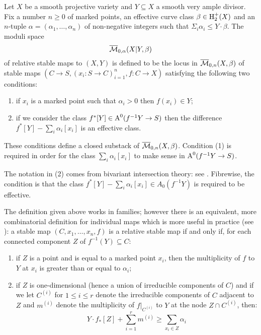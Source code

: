 \begin{definition} {\cite[Definition 1.1]{Ga}}  Let $X$ be a smooth projective variety and $Y \subseteq X$ a smooth very ample divisor. Fix a number $n \geq 0$ of marked points, an effective curve class $\beta \in \operatorname{H}_2^+(X)$ and an $n$-tuple $\alpha = (\alpha_1, \ldots, \alpha_n)$ of non-negative integers such that $\Sigma_i \alpha_i \leq Y \cdot \beta$. The moduli space
\begin{equation*} \overline{\mathcal{M}}_{0,\alpha}(X|Y,\beta) \end{equation*}
of relative stable maps to $(X,Y)$ is defined to be the locus in $\overline{\mathcal{M}}_{0,n}(X,\beta)$ of stable maps $(C \to S , (x_i : S \to C)_{i=1}^n , f : C \to X)$ satisfying the following two conditions:
\begin{enumerate}
\item if $x_i$ is a marked point such that $\alpha_i > 0$ then $f(x_i) \in Y$;
\item if we consider the class $f^* [Y] \in \operatorname{A}^0(f^{-1}Y \rightarrow S)$ then the difference $f^* [Y] - \sum_i \alpha_i [x_i]$ is an effective class.
\end{enumerate}
These conditions define a closed substack of $\overline{\mathcal{M}}_{0,n}(X,\beta)$. Condition (1) is required in order for the class $\sum_i \alpha_i [x_i]$ to make sense in $\operatorname{A}^0(f^{-1}Y \rightarrow S)$.
\end{definition}

\begin{remark} The notation in (2) comes from bivariant intersection theory: see \cite[\S 17]{FUL}. Fibrewise, the condition is that the class $f^*[Y] - \sum_i \alpha_i [x_i] \in A_0(f^{-1}Y)$ is required to be effective.\end{remark}

The definition given above works in families; however there is an equivalent, more combinatorial definition for individual maps which is more useful in practice (see \cite[Remark 1.4]{Ga}): a stable map $(C,x_1, \ldots, x_n,f)$ is a relative stable map if and only if, for each connected component $Z$ of $f^{-1}(Y) \subseteq C$:
\begin{enumerate}
\item if $Z$ is a point and is equal to a marked point $x_i$, then the multiplicity of $f$ to $Y$ at $x_i$ is greater than or equal to $\alpha_i$;
\item if $Z$ is one-dimensional (hence a union of irreducible components of $C$) and if we let $C^{(i)}$ for $1 \leq i \leq r$ denote the irreducible components of $C$ adjacent to $Z$ and $m^{(i)}$ denote the multiplicity of $f|_{C^{(i)}}$ to $Y$ at the node $Z \cap C^{(i)}$, then:
\begin{equation} \label{Relative stable map internal component inequality} Y \cdot f_* [Z] + \sum_{i=1}^r m^{(i)} \geq \sum_{x_i \in Z} \alpha_i \tag{\textasteriskcentered} \end{equation}
\end{enumerate}

